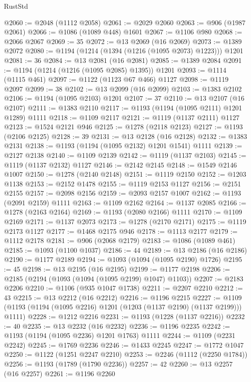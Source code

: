 \begin{lexlean}{RustStd}
\begin{coremodule}
{\begin{coremodule}
{{{{{{{{{{{{{{{{{{{{{{{{{{{{{{{@2060 := @2048 (@1112 @2058)
@2061 := @2029 @2060
@2063 := @906 (@1987 @2061)
@2066 := @1086 (@1089 @448) @1601
@2067 := @1106 @980
@2068 := @2066 @2067
@2069 := 35
@2072 := @13 @2069 (@16 @2069)
@2073 := @1389 @2072
@2080 := @1194 (@1214 (@1394 (@1216 (@1095 @2073) @1223))) @1201
@2081 := 36
@2084 := @13 @2081 (@16 @2081)
@2085 := @1389 @2084
@2091 := @1194 (@1214 (@1216 (@1095 @2085) @1395)) @1201
@2093 := @1114 (@1115 @461)
@2097 := @1122 (@1123 @67 @466) @1127
@2098 := @1119 @2097
@2099 := 38
@2102 := @13 @2099 (@16 @2099)
@2103 := @1383 @2102
@2106 := @1194 (@1095 @2103) @1201
@2107 := 37
@2110 := @13 @2107 (@16 @2107)
@2111 := @1383 @2110
@2117 := @1193 (@1194 (@1095 @2111) @1201 @1289) @1111
@2118 := @1109 @2117
@2121 := @1119 (@1137 @2111) @1127
@2123 := @1524 @2121 @946
@2125 := @1278 (@2118 @2123)
@2127 := @1193 (@2106 @2125)
@2128 := 39
@2131 := @13 @2128 (@16 @2128)
@2132 := @1383 @2131
@2138 := @1193 (@1194 (@1095 @2132) @1201 @1541) @1111
@2139 := @2127 @2138
@2140 := @1109 @2139
@2142 := @1119 (@1137 @2103)
@2145 := @1119 (@1137 @2132) @1127
@2146 := @2142 @2145
@2148 := @1549 @2146 @1007
@2150 := @1278 (@2140 @2148)
@2151 := @1119 @2150
@2152 := @1203 @1138
@2153 := @2152 @1478
@2155 := @1119 @2153 @1127
@2156 := @2151 @2155
@2157 := @2098 @2156
@2159 := @2093 @2157 @1007
@2162 := @1193 (@2091 @2159) @1111
@2163 := @1109 @2162
@2164 := @1137 @2085
@2166 := @1278 (@2163 @2164)
@2169 := @1193 (@2080 @2166) @1111
@2170 := @1109 @2169
@2171 := @1137 @2073
@2173 := @1278 (@2170 @2171)
@2175 := @1119 @2173 @1127
@2177 := @1468 @2175 @946
@2178 := @1113 @2177
@2179 := @1112 @2178
@2181 := @906 (@2068 @2179)
@2183 := @1086 (@1089 @461)
@2185 := @1093 (@1100 @1037)
@2186 := 44
@2189 := @13 @2186 (@16 @2186)
@2190 := @1177 @2189
@2194 := @1093 (@1094 (@1095 @2190) @1726)
@2195 := 45
@2198 := @13 @2195 (@16 @2195)
@2199 := @1177 @2198
@2206 := @2185 (@2194 (@1093 (@1094 (@1095 @2199) @1047) @1103))
@2207 := @2183 @2206
@2210 := @1106 (@935 @1047 @1738)
@2211 := @2207 @2210
@2212 := 43
@2215 := @13 @2212 (@16 @2212)
@2216 := @1196 @2215
@2227 := @1109 (@1193 (@1194 (@1095 @2216) @1201 (@1203 (@1137 @2190) (@1137 @2199))) @1111)
@2228 := @1212 @2216
@2231 := @1193 (@1228 (@1137 @2216))
@2232 := 40
@2235 := @13 @2232 (@16 @2232)
@2236 := @1196 @2235
@2242 := @1193 (@1194 (@1095 @2236) @1201 @1763) @1111
@2244 := @1109 (@2231 @2242)
@2245 := @1769 @2236
@2246 := @1433 @2245
@2247 := @1772 @1047
@2250 := @1122 (@1251 @2247 @2210)
@2253 := @2246 (@1112 (@2250 @1784))
@2256 := @1193 (@1789 (@1790 @2236))
@2257 := 42
@2260 := @13 @2257 (@16 @2257)
@2261 := @1196 @2260
}}}}}}}}}}}}}}}}}}}}}}}}}}}}}}}
\end{coremodule}}
\end{coremodule}
\end{lexlean}
